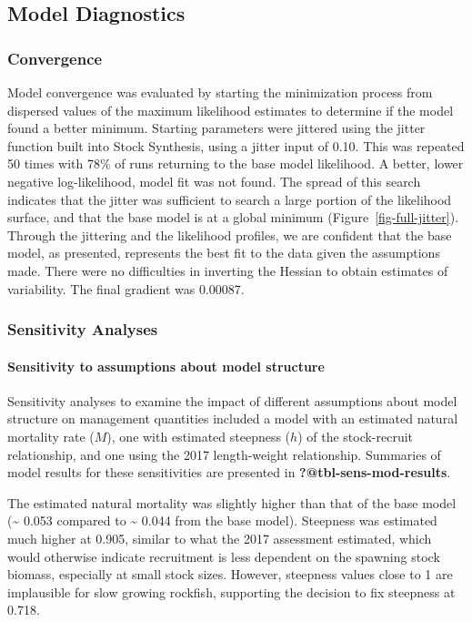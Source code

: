 \documentclass[
]{scrartcl}
\let\oldparagraph\paragraph
\renewcommand{\paragraph}[1]{\oldparagraph{#1}\mbox{}}
\begin{document}
\subsection{Model Diagnostics}\label{model-diagnostics}

\subsubsection{Convergence}\label{convergence}

Model convergence was evaluated by starting the minimization process
from dispersed values of the maximum likelihood estimates to determine
if the model found a better minimum. Starting parameters were jittered
using the jitter function built into Stock Synthesis, using a jitter
input of 0.10. This was repeated 50 times with 78\% of runs returning to
the base model likelihood. A better, lower negative log-likelihood,
model fit was not found. The spread of this search indicates that the
jitter was sufficient to search a large portion of the likelihood
surface, and that the base model is at a global minimum
(Figure~\ref{fig-full-jitter}). Through the jittering and the likelihood
profiles, we are confident that the base model, as presented, represents
the best fit to the data given the assumptions made. There were no
difficulties in inverting the Hessian to obtain estimates of
variability. The final gradient was 0.00087.

\subsubsection{Sensitivity Analyses}\label{sensitivity-analyses}

\paragraph{Sensitivity to assumptions about model
structure}\label{sensitivity-to-assumptions-about-model-structure}

Sensitivity analyses to examine the impact of different assumptions
about model structure on management quantities included a model with an
estimated natural mortality rate (\(M\)), one with estimated steepness
(\(h\)) of the stock-recruit relationship, and one using the 2017
length-weight relationship. Summaries of model results for these
sensitivities are presented in \textbf{?@tbl-sens-mod-results}.

The estimated natural mortality was slightly higher than that of the
base model (\textasciitilde{} 0.053 compared to \textasciitilde{} 0.044
from the base model). Steepness was estimated much higher at 0.905,
similar to what the 2017 assessment estimated, which would otherwise
indicate recruitment is less dependent on the spawning stock biomass,
especially at small stock sizes. However, steepness values close to 1
are implausible for slow growing rockfish, supporting the decision to
fix steepness at 0.718.
\end{document}
